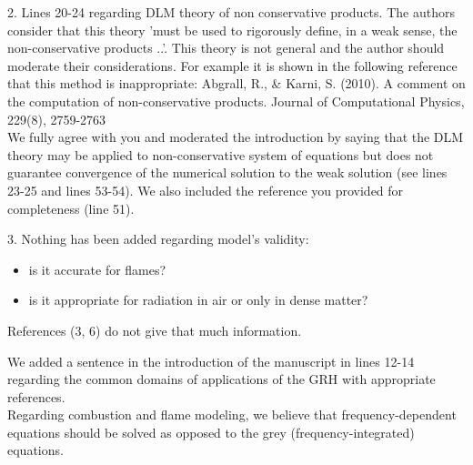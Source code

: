 \documentclass{article}
\begin{document}
{\color{blue}
 2. Lines 20-24 regarding DLM theory of non conservative products. The authors consider that this theory 'must be used to rigorously define, in a weak sense, the non-conservative products ..'. This theory is not general and the author should moderate their considerations. For example it is shown in the following reference that this method is inappropriate:
Abgrall, R., \& Karni, S. (2010). A comment on the computation of non-conservative products. Journal of Computational Physics, 229(8), 2759-2763\\}
We fully agree with you and moderated the introduction by saying that the DLM theory may be applied to non-conservative system of equations but does not guarantee convergence of the numerical solution to the weak solution (see lines 23-25 and lines 53-54). We also included the reference you provided for completeness (line 51).
\bigskip

{\color{blue}
3. Nothing has been added regarding model's validity:
\begin{itemize}
\item is it accurate for flames?
\item is it appropriate for radiation in air or only in dense matter?
\end{itemize}
References (3, 6) do not give that much information.\\}
We added a sentence in the introduction of the manuscript in lines 12-14 regarding the common domains of applications of the GRH with appropriate references.\\
Regarding combustion and flame modeling, we believe that frequency-dependent equations should be solved as opposed
to the grey (frequency-integrated) equations.  
\end{document}
